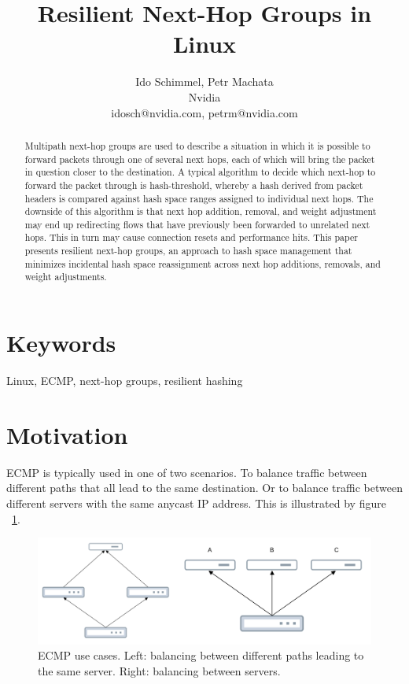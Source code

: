 \documentclass[letterpaper]{article}
\title{Resilient Next-Hop Groups in Linux}
\author{Ido Schimmel, Petr Machata\\
Nvidia\\
idosch@nvidia.com, petrm@nvidia.com\\
\newline
\newline
}
\begin{document}
\maketitle
\begin{abstract}
Multipath next-hop groups are used to describe a situation in which it is
possible to forward packets through one of several next hops, each of which
will bring the packet in question closer to the destination. A typical
algorithm to decide which next-hop to forward the packet through is
hash-threshold, whereby a hash derived from packet headers is compared
against hash space ranges assigned to individual next hops. The downside of
this algorithm is that next hop addition, removal, and weight adjustment
may end up redirecting flows that have previously been forwarded to
unrelated next hops. This in turn may cause connection resets and
performance hits. This paper presents resilient next-hop groups, an
approach to hash space management that minimizes incidental hash space
reassignment across next hop additions, removals, and weight adjustments.
\end{abstract}

\section{Keywords}
Linux, ECMP, next-hop groups, resilient hashing

\section{Motivation}

ECMP is typically used in one of two scenarios. To balance traffic between
different paths that all lead to the same destination. Or to balance
traffic between different servers with the same anycast IP address. This is
illustrated by figure ~\ref{fig:ECMP}.

\begin{figure}[h]
\includegraphics[width=\textwidth]{ECMP.png}
\caption{ECMP use cases. Left: balancing between different paths leading to
  the same server. Right: balancing between servers.}
\label{fig:ECMP}
\end{figure}
\end{document}
